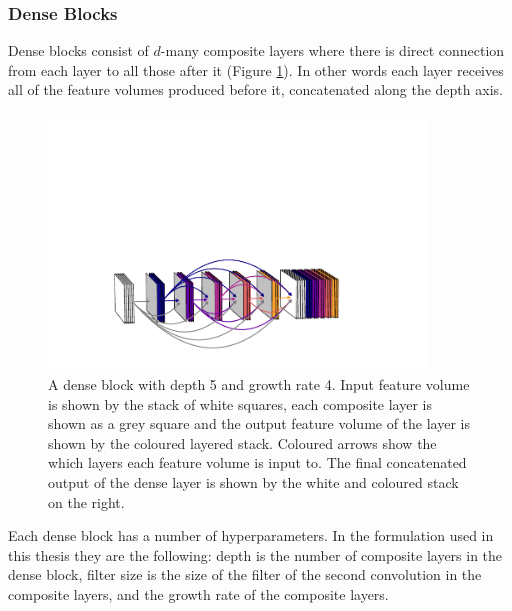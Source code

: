 \subsubsection{Dense Blocks}
Dense blocks consist of $d$-many composite layers where there is direct connection from each layer to all those after it (Figure \ref{fig:machine_learning:dense_block}). 
In other words each layer receives all of the feature volumes produced before it, concatenated along the depth axis. 
\begin{figure}[h!]
    \centering
    \includegraphics[width=0.90\textwidth]{figures/machine_learning/dense_block.pdf}
    \caption{A dense block with depth 5 and growth rate 4. Input feature volume is shown by the stack of white squares, each composite layer is shown as a grey square and the output feature volume of the layer is shown by the coloured layered stack. Coloured arrows show the which layers each feature volume is input to. The final concatenated output of the dense layer is shown by the white and coloured stack on the right.}
        \label{fig:machine_learning:dense_block}
\end{figure}
Each dense block has a number of hyperparameters. In the formulation used in this thesis they are the following: depth is the number of composite layers in the dense block, filter size is the size of the filter of the second convolution in the composite layers, and the growth rate of the composite layers.


